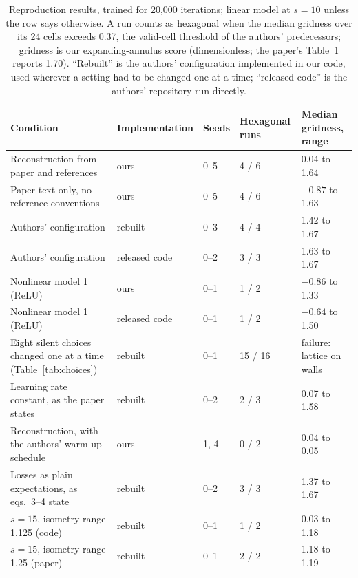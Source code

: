 \documentclass[10pt,letterpaper]{article}
\begin{document}
\begin{table}[H]
\centering
\captionsetup{font=sf, width=0.95\linewidth, skip=7pt}
\caption{ Reproduction results, trained for 20{,}000 iterations; linear model at $s=10$ unless the row says otherwise. A run counts as hexagonal when the median gridness over its 24 cells exceeds 0.37, the valid-cell threshold of the authors' predecessors; gridness is our expanding-annulus score (dimensionless; the paper's Table~1 reports 1.70). ``Rebuilt'' is the authors' configuration implemented in our code, used wherever a setting had to be changed one at a time; ``released code'' is the authors' repository run directly.}
\small
\begin{tabular}{L{5.6cm}L{2.3cm}L{1.1cm}L{1.8cm}L{2.7cm}}
\toprule
Condition & Implementation & Seeds & Hexagonal runs & Median gridness, range \\
\midrule
Reconstruction from paper and references & ours & 0--5 & 4 / 6 & 0.04 to 1.64 \\
Paper text only, no reference conventions & ours & 0--5 & 4 / 6 & $-0.87$ to 1.63 \\
Authors' configuration & rebuilt & 0--3 & 4 / 4 & 1.42 to 1.67 \\
Authors' configuration & released code & 0--2 & 3 / 3 & 1.63 to 1.67 \\
Nonlinear model 1 (ReLU) & ours & 0--1 & 1 / 2 & $-0.86$ to 1.33 \\
Nonlinear model 1 (ReLU) & released code & 0--1 & 1 / 2 & $-0.64$ to 1.50 \\
\midrule
Eight silent choices changed one at a time (Table~\ref{tab:choices}) & rebuilt & 0--1 & 15 / 16 & failure: lattice on walls \\
Learning rate constant, as the paper states & rebuilt & 0--2 & 2 / 3 & 0.07 to 1.58 \\
Reconstruction, with the authors' warm-up schedule & ours & 1, 4 & 0 / 2 & 0.04 to 0.05 \\
Losses as plain expectations, as eqs.~3--4 state & rebuilt & 0--2 & 3 / 3 & 1.37 to 1.67 \\
$s=15$, isometry range 1.125 (code) & rebuilt & 0--1 & 1 / 2 & 0.03 to 1.18 \\
$s=15$, isometry range 1.25 (paper) & rebuilt & 0--1 & 2 / 2 & 1.18 to 1.19 \\
\bottomrule
\end{tabular}
\label{tab:results}
\end{table}
\end{document}
